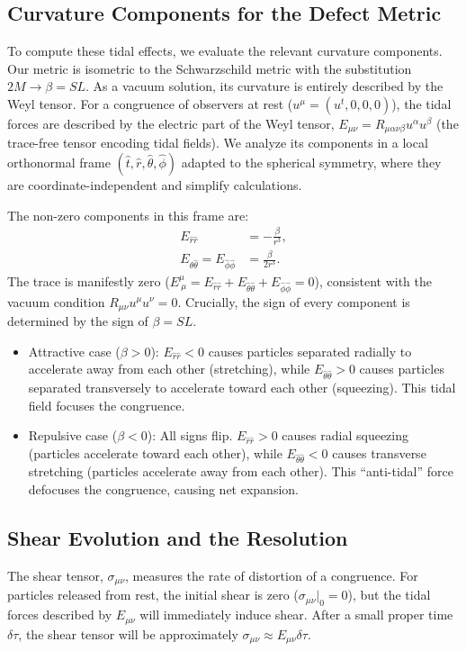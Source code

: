 \documentclass[%
  reprint,
  superscriptaddress,
  showpacs,
  showkeys,
  amsmath,amssymb,
  pra,
  longbibliography,
  floatfix,
]{revtex4-2}
\begin{document}
\subsection{Curvature Components for the Defect Metric}
To compute these tidal effects, we evaluate the relevant curvature components. Our metric is isometric to the Schwarzschild metric with the substitution $2M \to \beta = SL$. As a vacuum solution, its curvature is entirely described by the Weyl tensor. For a congruence of observers at rest ($u^\mu = (u^t, 0, 0, 0)$), the tidal forces are described by the electric part of the Weyl tensor, $E_{\mu\nu} = R_{\mu\alpha\nu\beta}u^\alpha u^\beta$ (the trace-free tensor encoding tidal fields). We analyze its components in a local orthonormal frame $(\hat{t}, \hat{r}, \hat{\theta}, \hat{\phi})$ adapted to the spherical symmetry, where they are coordinate-independent and simplify calculations.

The non-zero components in this frame are:
\begin{align}
E_{\hat{r}\hat{r}} &= -\frac{\beta}{r^3}, \\
E_{\hat{\theta}\hat{\theta}} = E_{\hat{\phi}\hat{\phi}} &= \frac{\beta}{2r^3}.
\end{align}
The trace is manifestly zero ($E^\mu_{\ \mu} = E_{\hat{r}\hat{r}} + E_{\hat{\theta}\hat{\theta}} + E_{\hat{\phi}\hat{\phi}} = 0$), consistent with the vacuum condition $R_{\mu\nu}u^\mu u^\nu = 0$. Crucially, the sign of every component is determined by the sign of $\beta = SL$.

\begin{itemize}
    \item {Attractive case ($\beta > 0$):} $E_{\hat{r}\hat{r}} < 0$ causes particles separated radially to accelerate away from each other (stretching), while $E_{\hat{\theta}\hat{\theta}} > 0$ causes particles separated transversely to accelerate toward each other (squeezing). This tidal field focuses the congruence.
    \item {Repulsive case ($\beta < 0$):} All signs flip. $E_{\hat{r}\hat{r}} > 0$ causes radial squeezing (particles accelerate toward each other), while $E_{\hat{\theta}\hat{\theta}} < 0$ causes transverse stretching (particles accelerate away from each other). This ``anti-tidal'' force defocuses the congruence, causing net expansion.
\end{itemize}

\subsection{Shear Evolution and the Resolution}
The shear tensor, $\sigma_{\mu\nu}$, measures the rate of distortion of a congruence. For particles released from rest, the initial shear is zero ($\sigma_{\mu\nu}|_0 = 0$), but the tidal forces described by $E_{\mu\nu}$ will immediately induce shear. After a small proper time $\delta\tau$, the shear tensor will be approximately $\sigma_{\mu\nu} \approx E_{\mu\nu} \delta\tau$.
\end{document}
